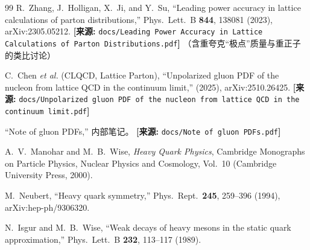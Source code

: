\documentclass[12pt,a4paper]{ctexart}
\theoremstyle{definition}
\begin{document}
\begin{thebibliography}{99}
R.~Zhang, J.~Holligan, X.~Ji, and Y.~Su,
``Leading power accuracy in lattice calculations of parton distributions,''
Phys.\ Lett.\ B \textbf{844}, 138081 (2023), arXiv:2305.05212.
\quad\textbf{[来源:} \texttt{docs/Leading Power Accuracy in Lattice Calculations of Parton Distributions.pdf}\textbf{]}
（含重夸克``极点''质量与重正子的类比讨论）

C.~Chen \textit{et al.} (CLQCD, Lattice Parton),
``Unpolarized gluon PDF of the nucleon from lattice QCD in the continuum limit,''
(2025), arXiv:2510.26425.
\quad\textbf{[来源:} \texttt{docs/Unpolarized gluon PDF of the nucleon from lattice QCD in the continuum limit.pdf}\textbf{]}

``Note of gluon PDFs,'' 内部笔记。
\quad\textbf{[来源:} \texttt{docs/Note of gluon PDFs.pdf}\textbf{]}

A.~V.~Manohar and M.~B.~Wise,
\textit{Heavy Quark Physics}, Cambridge Monographs on Particle Physics, Nuclear Physics and Cosmology, Vol.~10 (Cambridge University Press, 2000).

M.~Neubert,
``Heavy quark symmetry,''
Phys.\ Rept.\ \textbf{245}, 259--396 (1994), arXiv:hep-ph/9306320.

N.~Isgur and M.~B.~Wise,
``Weak decays of heavy mesons in the static quark approximation,''
Phys.\ Lett.\ B \textbf{232}, 113--117 (1989).

\end{thebibliography}
\end{document}
